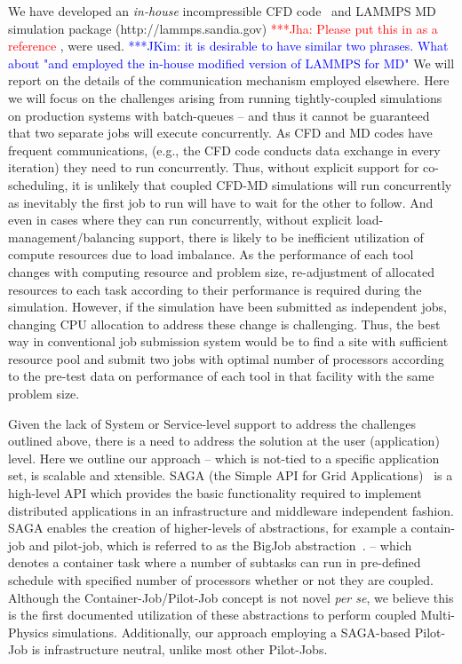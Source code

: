 \documentclass[a4paper]{article}
\newcommand{\jhanote}[1]{ {\textcolor{red} { ***Jha: #1 }}}
\newcommand{\jkimnote}[1]{ {\textcolor{blue} { ***JKim: #1 }}}
\newcommand{\jhanote}[1]{}
\begin{document}
We have developed an {\it in-house} incompressible CFD code~\cite{Lee:2006} and LAMMPS MD simulation package (http://lammps.sandia.gov) \jhanote{Please put this in as a reference}, were used.\jkimnote{it is desirable to have similar two phrases. What about "and employed the in-house modified version of LAMMPS for MD"} We will report on the details of the communication mechanism employed elsewhere. Here we will focus on the challenges arising from running tightly-coupled simulations on production systems with batch-queues -- and thus it cannot be guaranteed that two separate jobs will execute concurrently.  As CFD and MD codes have frequent communications, (e.g., the CFD code conducts data exchange in every iteration) they need to run concurrently.  Thus, without explicit support for co-scheduling, it is unlikely that coupled CFD-MD simulations will run concurrently as inevitably the first job to run will have to wait for the other to follow.
And even in cases where they can run concurrently, without explicit load-management/balancing support, there is likely to be inefficient utilization of compute resources due to load imbalance.  As the performance of each tool changes with computing resource and problem size, re-adjustment of allocated resources to each task according to their performance is required during the simulation. However, if the simulation have been submitted as independent jobs, changing CPU allocation to address these change is challenging. Thus, the best way in conventional job submission system would be to find a site with sufficient resource pool and submit two jobs with optimal number of processors according to the pre-test data on performance of each tool in that facility with the same problem size.

Given the lack of System or Service-level support to address the challenges outlined above, there is a need to address the solution at the user (application) level.  Here we outline our approach -- which is not-tied to a specific application set, is scalable and xtensible. SAGA (the Simple API for Grid Applications)~\cite{Jha:2008} is a high-level API which provides the basic functionality required to implement distributed applications in an infrastructure and middleware independent fashion.
SAGA enables the creation of higher-levels of abstractions, for example a contain-job and pilot-job, which is referred to as the BigJob abstraction~\cite{Jha:2009}.
-- which denotes a container task where a number of subtasks can run in pre-defined schedule with specified number of processors whether or not they are coupled.  Although the Container-Job/Pilot-Job concept is not novel {\it per se}, we believe this is the first documented utilization of these abstractions to perform coupled Multi-Physics simulations. Additionally, our approach employing a SAGA-based Pilot-Job is infrastructure neutral, unlike most other Pilot-Jobs.
\end{document}
